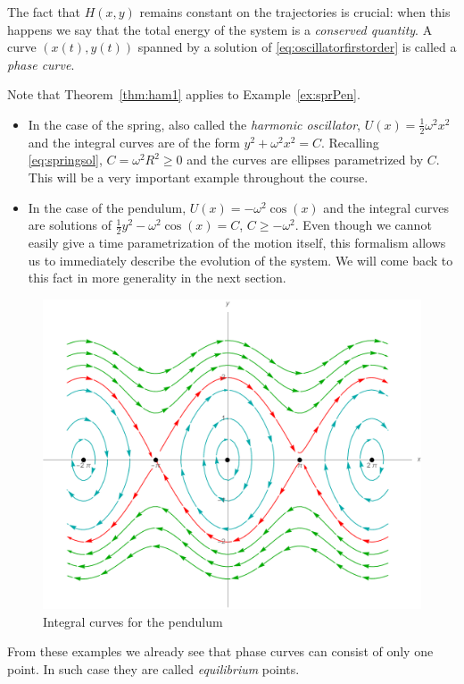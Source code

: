 \documentclass[english,fontsize=11pt,paper=a5,oneside]{scrbook}
\theoremstyle{definition}
\newenvironment{example}
  {\pushQED{\qed}\renewcommand{\qedsymbol}{$\lozenge$}\examplex}
  {\popQED\endexamplex}
\begin{document}
The fact that $H(x,y)$ remains constant on the trajectories is crucial: when this happens we say that the total energy of the system is a \emph{conserved quantity}.
A curve $(x(t), y(t))$ spanned by a solution of \eqref{eq:oscillatorfirstorder} is called a \emph{phase curve}.

\begin{example}
Note that Theorem~\ref{thm:ham1} applies to Example~\ref{ex:sprPen}.
\begin{itemize}
    \item In the case of the spring, also called the \emph{harmonic oscillator}, $U(x) = \frac12 \omega^2 x^2$ and the integral curves are of the form $y^2 + \omega^2 x^2 = C$.
    Recalling \eqref{eq:springsol}, $C = \omega^2 R^2 \geq 0$ and the curves are ellipses parametrized by $C$. 
    This will be a very important example throughout the course.
    \item In the case of the pendulum, $U(x) = -\omega^2 \cos(x)$ and the integral curves are solutions of $\frac12 y^2 - \omega^2 \cos(x) = C$, $C \geq -\omega^2$.
    Even though we cannot easily give a time parametrization of the motion itself, this formalism allows us to immediately describe the evolution of the system.
    We will come back to this fact in more generality in the next section.
\end{itemize}
\end{example}

\begin{figure}[ht]
    \centering
    \includegraphics[width=.7\linewidth]{images/pendulum.pdf}
    \caption{Integral curves for the pendulum}
    \label{fig:pendulum}
\end{figure}

From these examples we already see that phase curves can consist of only one point. In such case they are called \emph{equilibrium} points.
\end{document}
